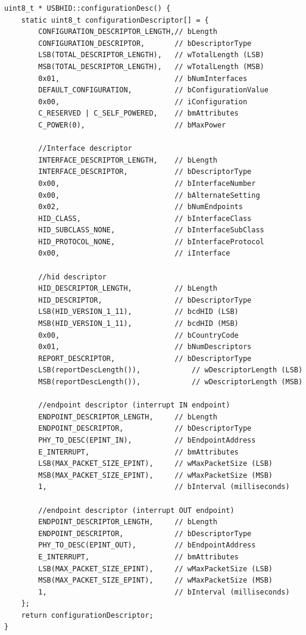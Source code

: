 \documentclass[pdftex,10pt,a4paper]{report}
\begin{document}
\begin{lstlisting}[label=HID Configuration Descriptor,caption=HID Configuration Descriptor]
uint8_t * USBHID::configurationDesc() {
    static uint8_t configurationDescriptor[] = {
        CONFIGURATION_DESCRIPTOR_LENGTH,// bLength
        CONFIGURATION_DESCRIPTOR,       // bDescriptorType
        LSB(TOTAL_DESCRIPTOR_LENGTH),   // wTotalLength (LSB)
        MSB(TOTAL_DESCRIPTOR_LENGTH),   // wTotalLength (MSB)
        0x01,                           // bNumInterfaces
        DEFAULT_CONFIGURATION,          // bConfigurationValue
        0x00,                           // iConfiguration
        C_RESERVED | C_SELF_POWERED,    // bmAttributes
        C_POWER(0),                     // bMaxPower

        //Interface descriptor
        INTERFACE_DESCRIPTOR_LENGTH,    // bLength
        INTERFACE_DESCRIPTOR,           // bDescriptorType
        0x00,                           // bInterfaceNumber
        0x00,                           // bAlternateSetting
        0x02,                           // bNumEndpoints
        HID_CLASS,                      // bInterfaceClass
        HID_SUBCLASS_NONE,              // bInterfaceSubClass
        HID_PROTOCOL_NONE,              // bInterfaceProtocol
        0x00,                           // iInterface

        //hid descriptor
        HID_DESCRIPTOR_LENGTH,          // bLength
        HID_DESCRIPTOR,                 // bDescriptorType
        LSB(HID_VERSION_1_11),          // bcdHID (LSB)
        MSB(HID_VERSION_1_11),          // bcdHID (MSB)
        0x00,                           // bCountryCode
        0x01,                           // bNumDescriptors
        REPORT_DESCRIPTOR,              // bDescriptorType
        LSB(reportDescLength()),  			// wDescriptorLength (LSB)
        MSB(reportDescLength()),  			// wDescriptorLength (MSB)

        //endpoint descriptor (interrupt IN endpoint)
        ENDPOINT_DESCRIPTOR_LENGTH,     // bLength
        ENDPOINT_DESCRIPTOR,            // bDescriptorType
        PHY_TO_DESC(EPINT_IN),          // bEndpointAddress
        E_INTERRUPT,                    // bmAttributes
        LSB(MAX_PACKET_SIZE_EPINT),     // wMaxPacketSize (LSB)
        MSB(MAX_PACKET_SIZE_EPINT),     // wMaxPacketSize (MSB)
        1,                              // bInterval (milliseconds)

        //endpoint descriptor (interrupt OUT endpoint)
        ENDPOINT_DESCRIPTOR_LENGTH,     // bLength
        ENDPOINT_DESCRIPTOR,            // bDescriptorType
        PHY_TO_DESC(EPINT_OUT),         // bEndpointAddress
        E_INTERRUPT,                    // bmAttributes
        LSB(MAX_PACKET_SIZE_EPINT),     // wMaxPacketSize (LSB)
        MSB(MAX_PACKET_SIZE_EPINT),     // wMaxPacketSize (MSB)
        1,                              // bInterval (milliseconds)
    };
    return configurationDescriptor;
}
\end{lstlisting}
\end{document}

